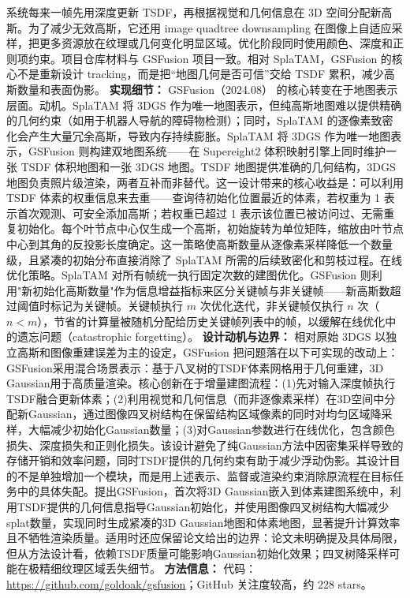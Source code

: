 系统每来一帧先用深度更新 TSDF，再根据视觉和几何信息在 3D 空间分配新高斯。为了减少无效高斯，它还用 image quadtree downsampling 在图像上自适应采样，把更多资源放在纹理或几何变化明显区域。优化阶段同时使用颜色、深度和正则项约束。项目仓库材料与 GSFusion 项目一致。相对 SplaTAM，GSFusion 的核心不是重新设计 tracking，而是把“地图几何是否可信”交给 TSDF 累积，减少高斯数量和表面伪影。
\textbf{实现细节：} GSFusion（2024.08） 的核心转变在于地图表示层面。动机。SplaTAM 将 3DGS 作为唯一地图表示，但纯高斯地图难以提供精确的几何约束（如用于机器人导航的障碍物检测）；同时，SplaTAM 的逐像素致密化会产生大量冗余高斯，导致内存持续膨胀。SplaTAM 将 3DGS 作为唯一地图表示，GSFusion 则构建双地图系统——在 Supereight2 体积映射引擎上同时维护一张 TSDF 体积地图和一张 3DGS 地图。TSDF 地图提供准确的几何结构，3DGS 地图负责照片级渲染，两者互补而非替代。这一设计带来的核心收益是：可以利用 TSDF 体素的权重信息来去重——查询待初始化位置最近的体素，若权重为 1 表示首次观测、可安全添加高斯；若权重已超过 1 表示该位置已被访问过、无需重复初始化。每个叶节点中心仅生成一个高斯，初始旋转为单位矩阵，缩放由叶节点中心到其角的反投影长度确定。这一策略使高斯数量从逐像素采样降低一个数量级，且紧凑的初始分布直接消除了 SplaTAM 所需的后续致密化和剪枝过程。在线优化策略。SplaTAM 对所有帧统一执行固定次数的建图优化。GSFusion 则利用"新初始化高斯数量"作为信息增益指标来区分关键帧与非关键帧——新高斯数超过阈值时标记为关键帧。关键帧执行 $m$ 次优化迭代，非关键帧仅执行 $n$ 次（$n < m$），节省的计算量被随机分配给历史关键帧列表中的帧，以缓解在线优化中的遗忘问题（catastrophic forgetting）。
\textbf{设计动机与边界：} 相对原始 3DGS 以独立高斯和图像重建误差为主的设定，GSFusion 把问题落在以下可实现的改动上：GSFusion采用混合场景表示：基于八叉树的TSDF体素网格用于几何重建，3D Gaussian用于高质量渲染。核心创新在于增量建图流程：(1)先对输入深度帧执行TSDF融合更新体素；(2)利用视觉和几何信息（而非逐像素采样）在3D空间中分配新Gaussian，通过图像四叉树结构在保留结构区域像素的同时对均匀区域降采样，大幅减少初始化Gaussian数量；(3)对Gaussian参数进行在线优化，包含颜色损失、深度损失和正则化损失。该设计避免了纯Gaussian方法中因密集采样导致的存储开销和效率问题，同时TSDF提供的几何约束有助于减少浮动伪影。其设计目的不是单独增加一个模块，而是用上述表示、监督或渲染约束消除原流程在目标任务中的具体失配。提出GSFusion，首次将3D Gaussian嵌入到体素建图系统中，利用TSDF提供的几何信息指导Gaussian初始化，并使用图像四叉树结构大幅减少splat数量，实现同时生成紧凑的3D Gaussian地图和体素地图，显著提升计算效率且不牺牲渲染质量。适用时还应保留论文给出的边界：论文未明确提及具体局限，但从方法设计看，依赖TSDF质量可能影响Gaussian初始化效果；四叉树降采样可能在极精细纹理区域丢失细节。
\textbf{方法信息：} 代码：\url{https://github.com/goldoak/gsfusion}；GitHub 关注度较高，约 228 stars。



